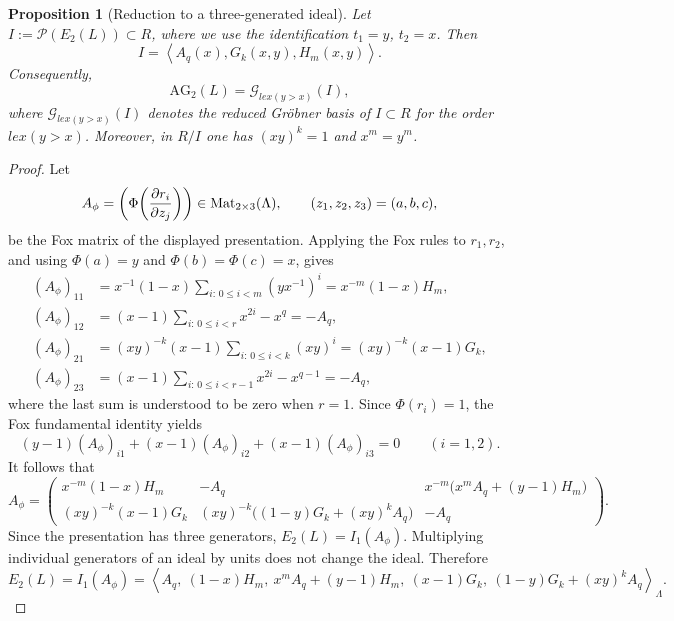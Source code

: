 \documentclass{article}
\theoremstyle{definition}
\theoremstyle{plain}
\newtheorem{proposition}[definition]{Proposition}
\newcommand{\Mat}{{\rm Mat}}
\newcommand{\PP}{\mathcal{P}}
\newcommand{\lex}{lex}
\newcommand{\ideal}[1]{\left\langle #1 \right\rangle}
\newcommand{\AG}{\mathrm{AG}}
\begin{document}
\begin{proposition}[Reduction to a three-generated ideal]
\label{prop:pretzel-reduction}
Let \(I:=\PP(E_2(L))\subset R\), where we use the identification
\(t_1=y\), \(t_2=x\).  Then
\[
I=\ideal{A_q(x),G_k(x,y),H_m(x,y)}.
\]
Consequently,
\[
\AG_2(L)=\mathcal G_{\lex(y>x)}(I),
\]
where \(\mathcal G_{\lex(y>x)}(I)\) denotes the reduced Gr\"obner basis of
\(I\subset R\) for the order \(\lex(y>x)\).  Moreover, in \(R/I\) one has
\((xy)^k=1\) and \(x^m=y^m\).
\end{proposition}

\begin{proof}
Let
\[
 A_\phi
 =\left(
   \Phi\!\left(\frac{\partial r_i}{\partial z_j}\right)
  \right)
 \in\Mat_{2\times 3}(\Lambda),
 \qquad (z_1,z_2,z_3)=(a,b,c),
\]
be the Fox matrix of the displayed presentation. 
Applying the Fox rules to \(r_1,r_2\), and using
\(\Phi(a)=y\) and \(\Phi(b)=\Phi(c)=x\), gives
\[
\begin{aligned}
 (A_\phi)_{11}
 &=x^{-1}(1-x)
   \sum_{i:\,0\le i<m}(yx^{-1})^i
  =x^{-m}(1-x)H_m,\\
 (A_\phi)_{12}
 &=(x-1)\sum_{i:\,0\le i<r}x^{2i}-x^q
  =-A_q,\\
 (A_\phi)_{21}
 &=(xy)^{-k}(x-1)
   \sum_{i:\,0\le i<k}(xy)^i
  =(xy)^{-k}(x-1)G_k,\\
 (A_\phi)_{23}
 &=(x-1)\sum_{i:\,0\le i<r-1}x^{2i}-x^{q-1}
  =-A_q,
\end{aligned}
\]
where the last sum is understood to be zero when \(r=1\).  Since
\(\Phi(r_i)=1\), the Fox fundamental identity yields
\[
 (y-1)(A_\phi)_{i1}
 +(x-1)(A_\phi)_{i2}
 +(x-1)(A_\phi)_{i3}=0
 \qquad (i=1,2).
\]
It follows that
\[
 A_\phi=
 \begin{pmatrix}
 x^{-m}(1-x)H_m
 &-A_q
 &x^{-m}\bigl(x^mA_q+(y-1)H_m\bigr)
 \\
 (xy)^{-k}(x-1)G_k
 &(xy)^{-k}\bigl((1-y)G_k+(xy)^kA_q\bigr)
 &-A_q
 \end{pmatrix}.
\]
Since the presentation has three generators,
\(E_2(L)=I_1(A_\phi)\). Multiplying individual generators of an ideal by units does not change the ideal.  Therefore
\[
 E_2(L)=I_1(A_\phi)
 =\ideal{
 A_q,\ (1-x)H_m,\ x^mA_q+(y-1)H_m,\
 (x-1)G_k,\ (1-y)G_k+(xy)^kA_q
 }_{\Lambda}.
\]


\end{proof}
\end{document}
